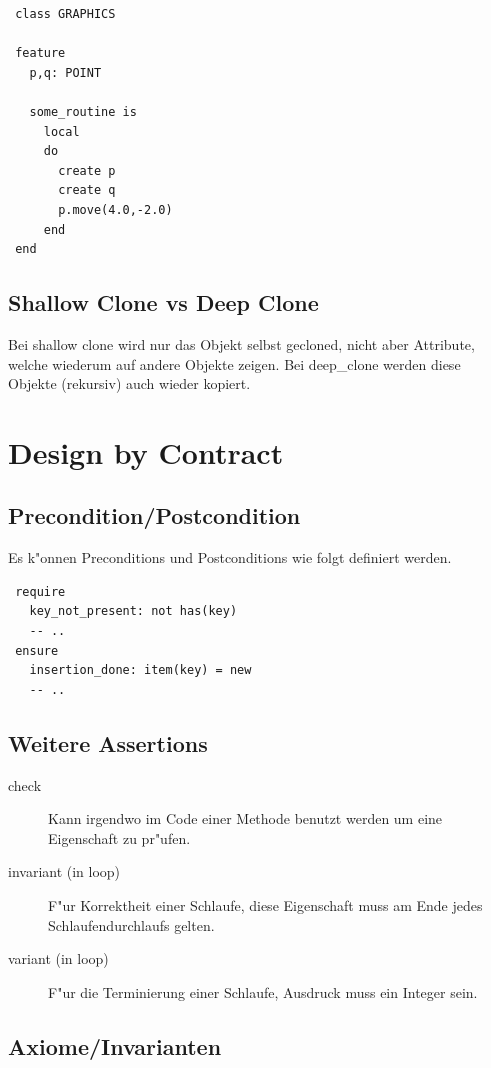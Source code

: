 \documentclass[german, 10pt, a4paper, twocolumn]{scrartcl}
\theoremstyle{definition}
\begin{document}
\begin{verbatim}
 class GRAPHICS

 feature
   p,q: POINT

   some_routine is
     local
     do
       create p
       create q
       p.move(4.0,-2.0)
     end
 end
\end{verbatim}

\subsection{Shallow Clone vs Deep Clone}

Bei shallow clone wird nur das Objekt selbst gecloned, nicht aber Attribute, welche wiederum auf andere Objekte zeigen. Bei deep\_clone werden diese Objekte (rekursiv) auch wieder kopiert.

\section{Design by Contract}

\subsection{Precondition/Postcondition}

Es k"onnen Preconditions und Postconditions wie folgt definiert werden.

\begin{verbatim}
 require
   key_not_present: not has(key)
   -- ..
 ensure
   insertion_done: item(key) = new
   -- ..
\end{verbatim}

\subsection{Weitere Assertions}

\begin{description}
	\item[check] Kann irgendwo im Code einer Methode benutzt werden um eine Eigenschaft zu pr"ufen.
	\item[invariant (in loop)] F"ur Korrektheit einer Schlaufe, diese Eigenschaft muss am Ende jedes Schlaufendurchlaufs gelten.
	\item[variant (in loop)] F"ur die Terminierung einer Schlaufe, Ausdruck muss ein Integer sein.
\end{description}

\subsection{Axiome/Invarianten}
\end{document}
